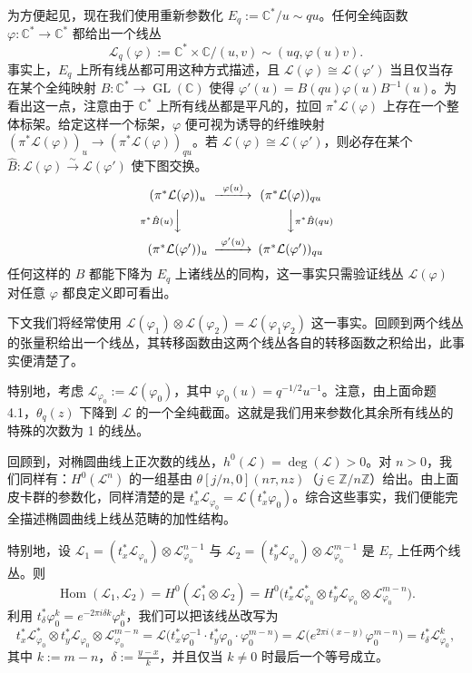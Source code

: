 \documentclass[11pt,a4paper]{article}
\theoremstyle{plain}
\theoremstyle{definition}
\begin{document}
为方便起见，现在我们使用重新参数化 $E_q:=\mathbb{C}^*/u\sim qu$。任何全纯函数 $\varphi\colon\mathbb{C}^*\to\mathbb{C}^*$ 都给出一个线丛
\[
\mathcal{L}_q(\varphi):=\mathbb{C}^*\times\mathbb{C}/(u,v)\sim(uq,\varphi(u)v).
\]
事实上，$E_q$ 上所有线丛都可用这种方式描述，且 $\mathcal{L}(\varphi)\cong\mathcal{L}(\varphi')$ 当且仅当存在某个全纯映射 $B\colon\mathbb{C}^*\to\operatorname{GL}(\mathbb{C})$ 使得 $\varphi'(u)=B(qu)\varphi(u)B^{-1}(u)$。为看出这一点，注意由于 $\mathbb{C}^*$ 上所有线丛都是平凡的，拉回 $\pi^*\mathcal{L}(\varphi)$ 上存在一个整体标架。给定这样一个标架，$\varphi$ 便可视为诱导的纤维映射 $(\pi^*\mathcal{L}(\varphi))_u\to(\pi^*\mathcal{L}(\varphi))_{qu}$。若 $\mathcal{L}(\varphi)\cong\mathcal{L}(\varphi')$，则必存在某个 $\hat B\colon\mathcal{L}(\varphi)\xrightarrow{\sim}\mathcal{L}(\varphi')$ 使下图交换。
\[
\begin{CD}
(\pi^*\mathcal{L}(\varphi))_u @>{\varphi(u)}>> (\pi^*\mathcal{L}(\varphi))_{qu}\\
@V{\pi^*\hat B(u)}VV @VV{\pi^*\hat B(qu)}V\\
(\pi^*\mathcal{L}(\varphi'))_u @>{\varphi'(u)}>> (\pi^*\mathcal{L}(\varphi'))_{qu}
\end{CD}
\]
任何这样的 $B$ 都能下降为 $E_q$ 上诸线丛的同构，这一事实只需验证线丛 $\mathcal{L}(\varphi)$ 对任意 $\varphi$ 都良定义即可看出。

下文我们将经常使用 $\mathcal{L}(\varphi_1)\otimes\mathcal{L}(\varphi_2)=\mathcal{L}(\varphi_1\varphi_2)$ 这一事实。回顾到两个线丛的张量积给出一个线丛，其转移函数由这两个线丛各自的转移函数之积给出，此事实便清楚了。

特别地，考虑 $\mathcal{L}_{\varphi_0}:=\mathcal{L}(\varphi_0)$，其中 $\varphi_0(u)=q^{-1/2}u^{-1}$。注意，由上面命题 4.1，$\theta_q(z)$ 下降到 $\mathcal{L}$ 的一个全纯截面。这就是我们用来参数化其余所有线丛的特殊的次数为 1 的线丛。

回顾到，对椭圆曲线上正次数的线丛，$h^0(\mathcal{L})=\deg(\mathcal{L})>0$。对 $n>0$，我们同样有：$H^0(\mathcal{L}^n)$ 的一组基由 $\theta[j/n,0](n\tau,nz)$（$j\in\mathbb{Z}/n\mathbb{Z}$）给出。由上面皮卡群的参数化，同样清楚的是 $t_x^*\mathcal{L}_{\varphi_0}=\mathcal{L}(t_x^*\varphi_0)$。综合这些事实，我们便能完全描述椭圆曲线上线丛范畴的加性结构。

特别地，设 $\mathcal{L}_1=(t_x^*\mathcal{L}_{\varphi_0})\otimes\mathcal{L}_{\varphi_0}^{n-1}$ 与 $\mathcal{L}_2=(t_y^*\mathcal{L}_{\varphi_0})\otimes\mathcal{L}_{\varphi_0}^{m-1}$ 是 $E_\tau$ 上任两个线丛。则
\[
\operatorname{Hom}(\mathcal{L}_1,\mathcal{L}_2)=H^0(\mathcal{L}_1^*\otimes\mathcal{L}_2)=H^0\bigl(t_x^*\mathcal{L}_{\varphi_0}^*\otimes t_y^*\mathcal{L}_{\varphi_0}\otimes\mathcal{L}_{\varphi_0}^{m-n}\bigr).
\]
利用 $t_\delta^*\varphi_0^k=e^{-2\pi i\delta k}\varphi_0^k$，我们可以把该线丛改写为
\[
t_x^*\mathcal{L}_{\varphi_0}^*\otimes t_y^*\mathcal{L}_{\varphi_0}\otimes\mathcal{L}_{\varphi_0}^{m-n}
=\mathcal{L}\bigl(t_x^*\varphi_0^{-1}\cdot t_y^*\varphi_0\cdot\varphi_0^{m-n}\bigr)
=\mathcal{L}\bigl(e^{2\pi i(x-y)}\varphi_0^{m-n}\bigr)
=t_\delta^*\mathcal{L}_{\varphi_0}^k,
\]
其中 $k:=m-n$，$\delta:=\frac{y-x}{k}$，并且仅当 $k\ne 0$ 时最后一个等号成立。
\end{document}
